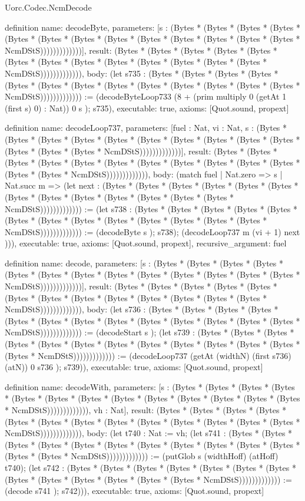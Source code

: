 \begin{lexlean}{Uorc.Codec.NcmDecode}
\begin{semanticmodule}
definition{
  name: decodeByte,
  parameters: [s : (Bytes * (Bytes * (Bytes * (Bytes * (Bytes * (Bytes * (Bytes * (Bytes * (Bytes * (Bytes * (Bytes * (Bytes * (Bytes * NcmDStS)))))))))))))],
  result: (Bytes * (Bytes * (Bytes * (Bytes * (Bytes * (Bytes * (Bytes * (Bytes * (Bytes * (Bytes * (Bytes * (Bytes * (Bytes * NcmDStS))))))))))))),
  body: (let s735 : (Bytes * (Bytes * (Bytes * (Bytes * (Bytes * (Bytes * (Bytes * (Bytes * (Bytes * (Bytes * (Bytes * (Bytes * (Bytes * NcmDStS))))))))))))) := (decodeByteLoop733 (8 + (prim multiply 0 (getAt 1 (first s) 0) : Nat)) 0 s ); s735),
  executable: true,
  axioms: [Quot.sound, propext]
}

definition{
  name: decodeLoop737,
  parameters: [fuel : Nat, vi : Nat, s : (Bytes * (Bytes * (Bytes * (Bytes * (Bytes * (Bytes * (Bytes * (Bytes * (Bytes * (Bytes * (Bytes * (Bytes * (Bytes * NcmDStS)))))))))))))],
  result: (Bytes * (Bytes * (Bytes * (Bytes * (Bytes * (Bytes * (Bytes * (Bytes * (Bytes * (Bytes * (Bytes * (Bytes * (Bytes * NcmDStS))))))))))))),
  body: (match fuel
    | Nat.zero => s
    | Nat.succ m => (let next : (Bytes * (Bytes * (Bytes * (Bytes * (Bytes * (Bytes * (Bytes * (Bytes * (Bytes * (Bytes * (Bytes * (Bytes * (Bytes * NcmDStS))))))))))))) := (let s738 : (Bytes * (Bytes * (Bytes * (Bytes * (Bytes * (Bytes * (Bytes * (Bytes * (Bytes * (Bytes * (Bytes * (Bytes * (Bytes * NcmDStS))))))))))))) := (decodeByte s ); s738); (decodeLoop737 m (vi + 1) next ))),
  executable: true,
  axioms: [Quot.sound, propext],
  recursive_argument: fuel
}

definition{
  name: decode,
  parameters: [s : (Bytes * (Bytes * (Bytes * (Bytes * (Bytes * (Bytes * (Bytes * (Bytes * (Bytes * (Bytes * (Bytes * (Bytes * (Bytes * NcmDStS)))))))))))))],
  result: (Bytes * (Bytes * (Bytes * (Bytes * (Bytes * (Bytes * (Bytes * (Bytes * (Bytes * (Bytes * (Bytes * (Bytes * (Bytes * NcmDStS))))))))))))),
  body: (let s736 : (Bytes * (Bytes * (Bytes * (Bytes * (Bytes * (Bytes * (Bytes * (Bytes * (Bytes * (Bytes * (Bytes * (Bytes * (Bytes * NcmDStS))))))))))))) := (decodeStart s ); (let s739 : (Bytes * (Bytes * (Bytes * (Bytes * (Bytes * (Bytes * (Bytes * (Bytes * (Bytes * (Bytes * (Bytes * (Bytes * (Bytes * NcmDStS))))))))))))) := (decodeLoop737 (getAt (widthN) (first s736) (atN)) 0 s736 ); s739)),
  executable: true,
  axioms: [Quot.sound, propext]
}

definition{
  name: decodeWith,
  parameters: [s : (Bytes * (Bytes * (Bytes * (Bytes * (Bytes * (Bytes * (Bytes * (Bytes * (Bytes * (Bytes * (Bytes * (Bytes * (Bytes * NcmDStS))))))))))))), vh : Nat],
  result: (Bytes * (Bytes * (Bytes * (Bytes * (Bytes * (Bytes * (Bytes * (Bytes * (Bytes * (Bytes * (Bytes * (Bytes * (Bytes * NcmDStS))))))))))))),
  body: (let t740 : Nat := vh; (let s741 : (Bytes * (Bytes * (Bytes * (Bytes * (Bytes * (Bytes * (Bytes * (Bytes * (Bytes * (Bytes * (Bytes * (Bytes * (Bytes * NcmDStS))))))))))))) := (putGlob s (widthHoff) (atHoff) t740); (let s742 : (Bytes * (Bytes * (Bytes * (Bytes * (Bytes * (Bytes * (Bytes * (Bytes * (Bytes * (Bytes * (Bytes * (Bytes * (Bytes * NcmDStS))))))))))))) := (decode s741 ); s742))),
  executable: true,
  axioms: [Quot.sound, propext]
}


\end{semanticmodule}
\end{lexlean}
